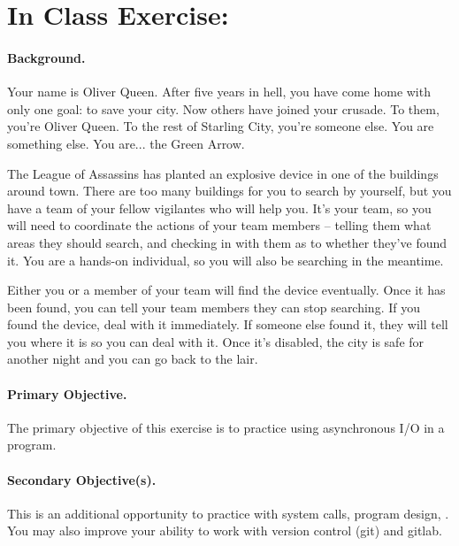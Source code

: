 




\section*{In Class Exercise: }

\paragraph{Background.}
Your name is Oliver Queen. After five years in hell, you have come home with only one goal: to save your city. Now others have joined your crusade. To them, you're Oliver Queen. To the rest of Starling City, you're someone else. You are something else. You are... the Green Arrow.

The League of Assassins has planted an explosive device in one of the buildings around town. There are too many buildings for you to search by yourself, but you have a team of your fellow vigilantes who will help you. It's your team, so you will need to coordinate the actions of your team members -- telling them what areas they should search, and checking in with them as to whether they've found it. You are a hands-on individual, so you will also be searching in the meantime. 

Either you or a member of your team will find the device eventually. Once it has been found, you can tell your team members they can stop searching. If you found the device, deal with it immediately. If someone else found it, they will tell you where it is so you can deal with it. Once it's disabled, the city is safe for another night and you can go back to the lair.


\paragraph{Primary Objective.} The primary objective of this exercise is to practice using asynchronous I/O in a program.

\paragraph{Secondary Objective(s).} This is an additional opportunity to practice with system calls, program design, . You may also improve your ability to work with version control (git) and gitlab.

